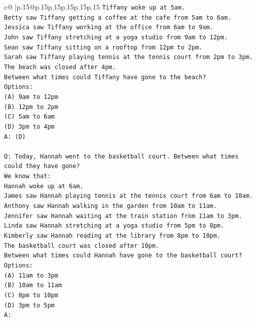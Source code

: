 \documentclass{article}
\begin{document}
{\begin{supertabular}{c@{$\;$}|p{.15\linewidth}@{}p{.15\linewidth}p{.15\linewidth}p{.15\linewidth}p{.15\linewidth}p{.15\linewidth}}
{{{\texttt{Tiffany woke up at 5am.} \\
\texttt{Betty saw Tiffany getting a coffee at the cafe from 5am to 6am.} \\
\texttt{Jessica saw Tiffany working at the office from 6am to 9am.} \\
\texttt{John saw Tiffany stretching at a yoga studio from 9am to 12pm.} \\
\texttt{Sean saw Tiffany sitting on a rooftop from 12pm to 2pm.} \\
\texttt{Sarah saw Tiffany playing tennis at the tennis court from 2pm to 3pm.} \\
\texttt{The beach was closed after 4pm.} \\
\texttt{Between what times could Tiffany have gone to the beach?} \\
\texttt{Options:} \\
\texttt{(A) 9am to 12pm} \\
\texttt{(B) 12pm to 2pm} \\
\texttt{(C) 5am to 6am} \\
\texttt{(D) 3pm to 4pm} \\
\texttt{A: (D)} \\
\\ 
\texttt{Q: Today, Hannah went to the basketball court. Between what times could they have gone?} \\
\texttt{We know that:} \\
\texttt{Hannah woke up at 6am.} \\
\texttt{James saw Hannah playing tennis at the tennis court from 6am to 10am.} \\
\texttt{Anthony saw Hannah walking in the garden from 10am to 11am.} \\
\texttt{Jennifer saw Hannah waiting at the train station from 11am to 3pm.} \\
\texttt{Linda saw Hannah stretching at a yoga studio from 5pm to 8pm.} \\
\texttt{Kimberly saw Hannah reading at the library from 8pm to 10pm.} \\
\texttt{The basketball court was closed after 10pm.} \\
\texttt{Between what times could Hannah have gone to the basketball court?} \\
\texttt{Options:} \\
\texttt{(A) 11am to 3pm} \\
\texttt{(B) 10am to 11am} \\
\texttt{(C) 8pm to 10pm} \\
\texttt{(D) 3pm to 5pm} \\
\texttt{A:} \\
            }
        }
    }
     \\ \\


\end{supertabular}}
\end{document}
